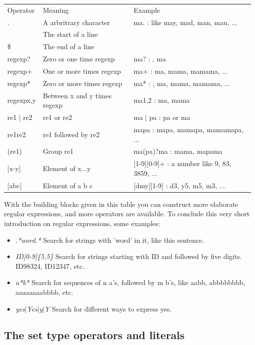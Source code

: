 \begin{tabular}{lll}
Operator & Meaning & Example \\
. & A arbritrary character & ma. : like may, mad, man, mau, ...\\
$\hat{}$ & The start of a line & \\
\$ & The end of a line & \\
regexp? & Zero or one time regexp & ma? : , ma\\
regexp+ & One or more times regexp & ma+ : ma, mama, mamama, ...\\
regexp* & Zero or more times regexp & ma* : , ma, mama, mamama, ...\\
regexp{x,y} & Between x and y times regexp & ma{1,2} : ma, mama\\
re1 $|$ re2 & re1 or re2 & ma $|$ pa : pa or ma\\
re1re2 & re1 followed by re2 & mapa : mapa, mamapa, mamamapa, ...\\
(re1) & Group re1 & ma(pa)?ma : mama, mapama\\
$[$x-y$]$ & Element of x...y & $[$1-9$][$0-9$]$+ : a number like 9, 83, 3859, ...\\
$[$abc$]$ & Element of a b c & $[$dmy$][$1-9$]$ : d3, y5, m5, m3, ...\\
\end{tabular}

With the building blocks given in this table you can construct more elaborate
regular expressions, and more operators are available. To conclude this very
short introduction on regular expressions, some examples:\\
\begin{itemize}
\item \textit{.*word.*} Search for strings with 'word' in it, like this
sentence.
\item \textit{ID[0-9]\{5,5\}} Search for strings starting with ID and followed
by five digits. ID98324, ID12347, etc.
\item \textit{a*b*} Search for sequences of n a's, followed by m b's, like
aabb, abbbbbbbb, aaaaaaaabbbb, etc.
\item \textit{yes$|$Yes$|$y$|$Y} Search for different ways to express yes.
\end{itemize}

\subsection{The set type operators and literals}

